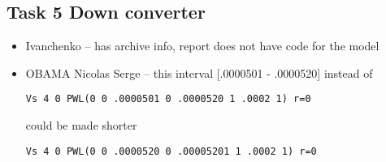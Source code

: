\documentclass[a4paper,landscape,11pt]{article}
\begin{document}
\subsection{Task 5 Down converter}
\begin{itemize}
\item Ivanchenko -- has archive info, report does not have code for the model 

\item OBAMA Nicolas Serge -- this interval [.0000501 - .0000520]  instead of
\begin{verbatim}
Vs 4 0 PWL(0 0 .0000501 0 .0000520 1 .0002 1) r=0
\end{verbatim}
could be made shorter
\begin{verbatim}
Vs 4 0 PWL(0 0 .0000520 0 .00005201 1 .0002 1) r=0
\end{verbatim}

\end{itemize}
\end{document}
